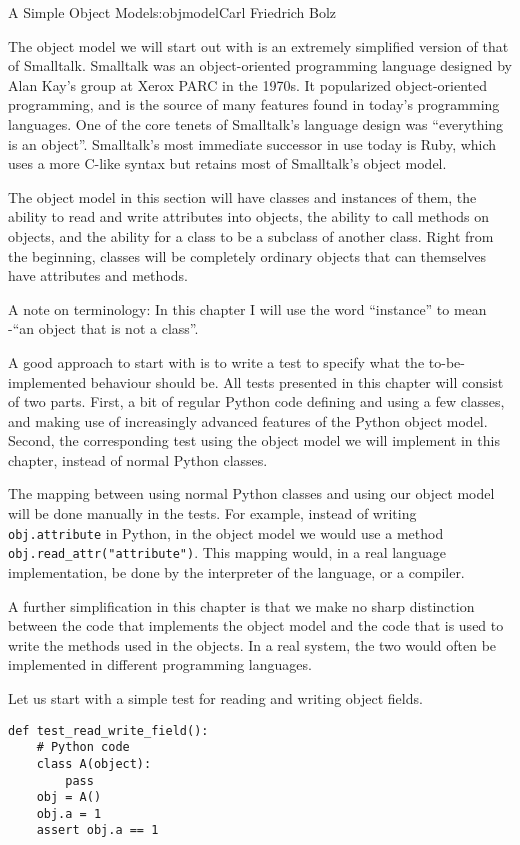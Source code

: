 \begin{aosachapter}{A Simple Object Model}{s:objmodel}{Carl Friedrich Bolz}
\label{method-based-model}

The object model we will start out with is an extremely simplified
version of that of Smalltalk. Smalltalk was an object-oriented
programming language designed by Alan Kay's group at Xerox PARC in the
1970s. It popularized object-oriented programming, and is the source of
many features found in today's programming languages. One of the core
tenets of Smalltalk's language design was ``everything is an object''.
Smalltalk's most immediate successor in use today is Ruby, which uses a
more C-like syntax but retains most of Smalltalk's object model.

The object model in this section will have classes and instances of
them, the ability to read and write attributes into objects, the ability
to call methods on objects, and the ability for a class to be a subclass
of another class. Right from the beginning, classes will be completely
ordinary objects that can themselves have attributes and methods.

A note on terminology: In this chapter I will use the word ``instance''
to mean -``an object that is not a class''.

A good approach to start with is to write a test to specify what the
to-be-implemented behaviour should be. All tests presented in this
chapter will consist of two parts. First, a bit of regular Python code
defining and using a few classes, and making use of increasingly
advanced features of the Python object model. Second, the corresponding
test using the object model we will implement in this chapter, instead
of normal Python classes.

The mapping between using normal Python classes and using our object
model will be done manually in the tests. For example, instead of
writing \texttt{obj.attribute} in Python, in the object model we would
use a method \texttt{obj.read\_attr("attribute")}. This mapping would,
in a real language implementation, be done by the interpreter of the
language, or a compiler.

A further simplification in this chapter is that we make no sharp
distinction between the code that implements the object model and the
code that is used to write the methods used in the objects. In a real
system, the two would often be implemented in different programming
languages.

Let us start with a simple test for reading and writing object fields.

\begin{verbatim}
def test_read_write_field():
    # Python code
    class A(object):
        pass
    obj = A()
    obj.a = 1
    assert obj.a == 1


\end{verbatim}
\end{aosachapter}
